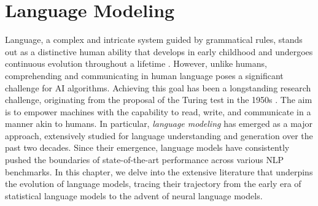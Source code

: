 \chapter{Language Modeling}
\label{chapter:related-language-modeling}


\renewcommand{\leftmark}{\spacedlowsmallcaps{Language Modeling}}


\minitoc







Language, a complex and intricate system guided by grammatical rules, stands out as a distinctive human ability that develops in early childhood and undergoes continuous evolution throughout a lifetime \citep{hauser2002faculty}. However, unlike humans, comprehending and communicating in human language poses a significant challenge for \ac{AI} algorithms. Achieving this goal has been a longstanding research challenge, originating from the proposal of the Turing test in the 1950s \citep{turing2009computing}. The aim is to empower machines with the capability to read, write, and communicate in a manner akin to humans. In particular, \textit{language modeling} has emerged as a major approach, extensively studied for language understanding and generation over the past two decades. Since their emergence, language models have consistently pushed the boundaries of state-of-the-art performance across various \ac{NLP} benchmarks. In this chapter, we delve into the extensive literature that underpins the evolution of language models, tracing their trajectory from the early era of statistical language models to the advent of neural language models. 

